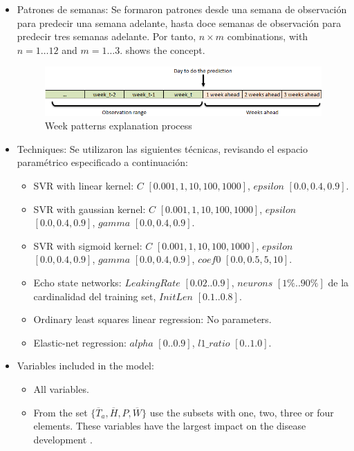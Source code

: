 \begin{itemize}
\item Patrones de semanas: Se formaron patrones desde una semana
de observación para predecir una semana adelante, hasta doce semanas de
observación para predecir tres semanas adelante. Por tanto, $n\times{}m$ combinations, 
with $n=1\ldots{}12$ and $m=1\ldots{}3$.  shows the concept.
%
\begin{figure}[H] 
 \centering
 \includegraphics[scale=.7]{Usado_2017-04-30_Weeks_Patrones}
 \caption{Week patterns explanation process} 
 \label{figura8} 
\end{figure}
%

\item Techniques: Se utilizaron las siguientes técnicas, revisando el espacio
paramétrico especificado a continuación:
\begin{itemize}
\item SVR with linear kernel: $C$ $[0.001, 1, 10, 100, 1000]$, $epsilon$ $[0.0, 0.4, 0.9]$.
\item SVR with gaussian kernel: $C$ $[0.001, 1, 10, 100, 1000]$, $epsilon$ $[0.0, 0.4, 0.9]$,
$gamma$ $[0.0, 0.4, 0.9]$.
\item SVR with sigmoid kernel: $C$ $[0.001, 1, 10, 100, 1000]$, $epsilon$ $[0.0, 0.4, 0.9]$,
$gamma$ $[0.0, 0.4, 0.9]$, $coef0$ $[0.0, 0.5, 5, 10]$.
\item Echo state networks: $LeakingRate$ $[0.02 .. 0.9]$, $neurons$ $[1\% .. 90\%]$ de la 
cardinalidad del training set, $InitLen$ $[ 0.1 .. 0.8 ]$.
\item Ordinary least squares linear regression: No parameters.
\item Elastic-net regression: $alpha$ $[0 .. 0.9]$, $l1\_ratio$ $[0 .. 1.0]$.
\end{itemize}

\item Variables included in the model:
\begin{itemize}
\item All variables.
\item From the set $\{ \overline{T}_{a} , \overline{H}, P ,
  \overline{W} \}$ use the subsets with one, two, three or four
  elements. These variables have the largest impact on the disease
  development \citep{MarinVargas1995}.
\end{itemize}
\end{itemize}
